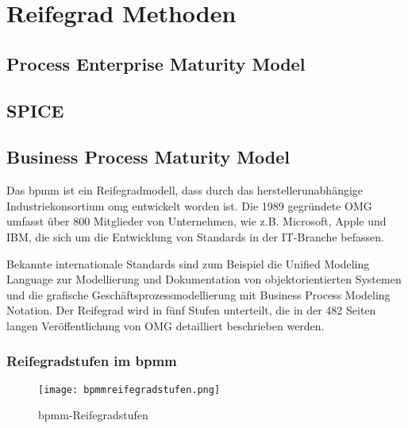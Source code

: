 \newpage
\section{Reifegrad Methoden}

\subsection{Process Enterprise Maturity Model}


\subsection{SPICE}


\subsection{Business Process Maturity Model}

Das \ac{bpmm} ist ein Reifegradmodell, dass durch das herstellerunabhängige Industriekonsortium \ac{omg} entwickelt worden ist.
Die 1989 gegründete OMG umfasst über 800 Mitglieder von Unternehmen, wie z.B. Microsoft, Apple und IBM, die sich um die Entwicklung von Standards in der IT-Branche befassen.\par
Bekannte internationale Standards sind zum Beispiel die Unified Modeling Language zur Modellierung und Dokumentation von objektorientierten Systemen
und die grafische Geschäftsprozessmodellierung mit Business Process Modeling Notation. Der Reifegrad wird in fünf Stufen unterteilt, die in der 482 Seiten langen Veröffentlichung von OMG detailliert beschrieben werden.

\subsubsection{Reifegradstufen im \acs{bpmm}}

\begin{figure}[H]
  \centering
  \caption{\acs{bpmm}-Reifegradstufen}
  \texttt{[image: bpmmreifegradstufen.png]}
  \label{fig:reifegradstufen}
\end{figure}

